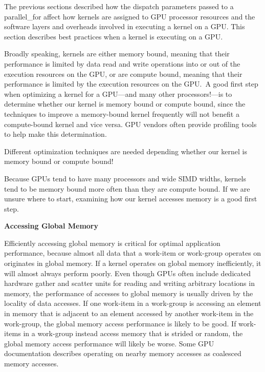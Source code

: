 The previous sections described how the dispatch parameters passed to a parallel\_for affect how kernels are assigned to GPU processor resources and the software layers and overheads involved in executing a kernel on a GPU. This section describes best practices when a kernel is executing on a GPU.\par

Broadly speaking, kernels are either memory bound, meaning that their performance is limited by data read and write operations into or out of the execution resources on the GPU, or are compute bound, meaning that their performance is limited by the execution resources on the GPU. A good first step when optimizing a kernel for a GPU—and many other processors!—is to determine whether our kernel is memory bound or compute bound, since the techniques to improve a memory-bound kernel frequently will not benefit a compute-bound kernel and vice versa. GPU vendors often provide profiling tools to help make this determination.\par

\begin{tcolorbox}[colback=red!5!white,colframe=red!75!black]
Different optimization techniques are needed depending whether our kernel is memory bound or compute bound!
\end{tcolorbox}

Because GPUs tend to have many processors and wide SIMD widths, kernels tend to be memory bound more often than they are compute bound. If we are unsure where to start, examining how our kernel accesses memory is a good first step.\par

\hspace*{\fill} \par %
\textbf{Accessing Global Memory}

Efficiently accessing global memory is critical for optimal application performance, because almost all data that a work-item or work-group operates on originates in global memory. If a kernel operates on global memory inefficiently, it will almost always perform poorly. Even though GPUs often include dedicated hardware gather and scatter units for reading and writing arbitrary locations in memory, the performance of accesses to global memory is usually driven by the locality of data accesses. If one work-item in a work-group is accessing an element in memory that is adjacent to an element accessed by another work-item in the work-group, the global memory access performance is likely to be good. If work-items in a work-group instead access memory that is strided or random, the global memory access performance will likely be worse. Some GPU documentation describes operating on nearby memory accesses as coalesced memory accesses.\par

